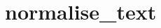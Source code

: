 \label{appendix:normalise-text}
\chapter{normalise\_text}

\inputminted{python}{code/normalise_text}
